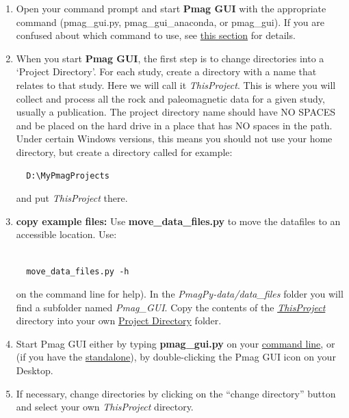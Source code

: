 \documentclass[11pt]{book}
\begin{document}
{{\begin{enumerate}

\item Open your command prompt and start {\bf Pmag GUI} with the appropriate command (pmag\_gui.py, pmag\_gui\_anaconda, or pmag\_gui).  If you are confused about which command to use, see \href{#which_command}{this section} for details.

\item  When you start {\bf Pmag GUI}, the first step is to change directories into a  `Project Directory'. For each study, create a directory with a name that relates to that study. Here we will call it {\it ThisProject}.  This is where you will collect and process all the rock and paleomagnetic data for a given study, usually a publication. The project directory name should have NO SPACES and be placed on the hard drive in a place that has NO spaces in the path. Under certain Windows versions, this means you should not use your home directory, but create a directory called for example:\begin{verbatim}
  D:\MyPmagProjects\end{verbatim} and put {\it ThisProject} there.
%
%
%


\item \textbf{copy example files:}  Use \textbf{move\_data\_files.py} to move the  datafiles to an accessible location.  Use: \begin{verbatim}

  move_data_files.py -h\end{verbatim} on the command line for help).  In the {\it PmagPy-data/data\_files } folder you will find a subfolder named {\it Pmag\_GUI}. Copy the contents of the  \href{#Project_Directory}{\it ThisProject} directory  into  your  own \href{#Project_Directory}{Project Directory} folder.
 \item Start Pmag GUI either by typing {\bf pmag\_gui.py} on your \href{#command_line}{command line}, or (if you have the \href{#standalone}{standalone}), by double-clicking the Pmag GUI icon on your Desktop.
 \item If necessary, change directories by clicking  on the ``change directory'' button and select your own {\it ThisProject} directory.
 \end{enumerate}

}}
\end{document}
